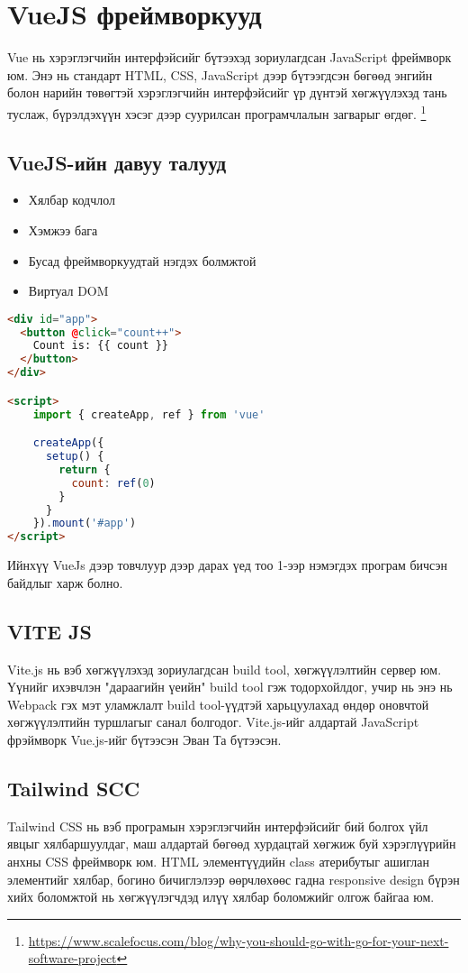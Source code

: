 \section{VueJS фреймворкууд}
Vue нь хэрэглэгчийн интерфэйсийг бүтээхэд зориулагдсан JavaScript фреймворк юм. Энэ нь стандарт HTML, CSS, JavaScript дээр бүтээгдсэн бөгөөд энгийн болон нарийн төвөгтэй хэрэглэгчийн интерфэйсийг үр дүнтэй хөгжүүлэхэд тань туслаж, бүрэлдэхүүн хэсэг дээр суурилсан програмчлалын загварыг өгдөг. \footnote{\url{https://www.scalefocus.com/blog/why-you-should-go-with-go-for-your-next-software-project}}

\subsection{VueJS-ийн давуу талууд}
\begin{itemize}
    \item Хялбар кодчлол
    \item Хэмжээ бага
    \item Бусад фреймворкуудтай нэгдэх болмжтой
    \item Виртуал DOM
\end{itemize}

\begin{lstlisting}[language=HTML, caption=VueJS framework-ийн кодны жишээ, frame=single]
<div id="app">
  <button @click="count++">
    Count is: {{ count }}
  </button>
</div>

<script>
    import { createApp, ref } from 'vue'

    createApp({
      setup() {
        return {
          count: ref(0)
        }
      }
    }).mount('#app')
</script>
\end{lstlisting}
Ийнхүү VueJs дээр товчлуур дээр дарах үед тоо 1-ээр нэмэгдэх програм бичсэн байдлыг харж болно.

\subsection{VITE JS}
Vite.js нь вэб хөгжүүлэхэд зориулагдсан build tool, хөгжүүлэлтийн сервер юм. Үүнийг ихэвчлэн "дараагийн үеийн" build tool гэж тодорхойлдог, учир нь энэ нь Webpack гэх мэт уламжлалт build tool-үүдтэй харьцуулахад өндөр оновчтой хөгжүүлэлтийн туршлагыг санал болгодог. Vite.js-ийг алдартай JavaScript фрэймворк Vue.js-ийг бүтээсэн Эван Та бүтээсэн.

\subsection{Tailwind SCC}
Tailwind CSS нь вэб програмын хэрэглэгчийн интерфэйсийг бий болгох үйл явцыг хялбаршуулдаг, маш алдартай бөгөөд хурдацтай хөгжиж буй хэрэглүүрийн анхны CSS фреймворк юм. HTML элементүүдийн class атерибутыг ашиглан элементийг хялбар, богино бичиглэлээр өөрчлөхөөс гадна responsive design бүрэн хийх боломжтой нь хөгжүүлэгчдэд илүү хялбар боломжийг олгож байгаа юм.

